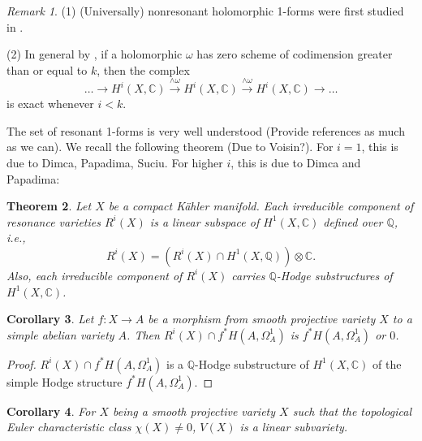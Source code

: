 \documentclass[a4paper,12pt,reqno]{amsart}
\newtheorem{theorem}{Theorem}[section]
\theoremstyle{plain}
\newtheorem{corollary}[theorem]{Corollary}
\theoremstyle{remark}
\newtheorem{remark}[theorem]{Remark}
\newcommand{\Q}{\mathbb Q}
\newcommand{\C}{\mathbb C}
\begin{document}
\begin{remark}

(1) (Universally) nonresonant  holomorphic 1-forms were first studied in \cite{SS19}.

(2) In general by \cite[Proposition 3.4]{GL87}, if a holomorphic $\omega$ has zero scheme of codimension greater than or equal to $k$, then the complex $$\ldots\to H^{i}(X,\C)\overset{\wedge\omega}{\rightarrow}H^{i}(X,\C)\overset{\wedge\omega}{\rightarrow}H^{i}(X,\C)\to\ldots$$ is exact whenever $i<k.$ 
\end{remark}

The set of resonant 1-forms is very well understood {\color{red} (Provide references as much as we can)}. We recall the following theorem {\color{red} (Due to Voisin?)}. For $i=1$, this is due to Dimca, Papadima, Suciu. For higher $i$, this is due to Dimca and Papadima:

\begin{theorem}{\cite[Theorem C, Corollary 1.7]{DiPa13}}\label{resonant}
Let $X$ be a compact K\"ahler manifold. Each irreducible component of resonance varieties $R^i(X)$ is a linear subspace of $H^1(X, \C)$ defined over $\Q$, i.e., $$R^i(X)=(R^i(X)\cap H^1(X, \Q))\otimes\C.$$ Also,  each irreducible component of $R^i(X)$ carries $\Q$-Hodge substructures of $H^1(X, \C)$.
\end{theorem} 

\begin{corollary}
Let $f:X\to A$ be a morphism from smooth projective variety $X$ to a simple abelian  variety $A$. Then $R^i(X)\cap f^*H(A, \Omega_A^1)$ is $f^*H(A, \Omega_A^1)$ or $0$.
\end{corollary}

\begin{proof}
$R^i(X)\cap f^*H(A, \Omega_A^1)$ is a $\Q$-Hodge substructure of $H^1(X, \C)$ of the simple Hodge structure $f^*H(A, \Omega_A^1)$.
\end{proof}

\begin{corollary}\label{ECNT}
For $X$ being a smooth projective variety $X$ such that the topological Euler characteristic class $\chi(X)\not=0$, $V(X)$ is a linear subvariety.
\end{corollary}


%
\end{document}
